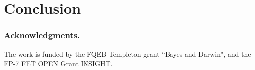 \documentclass[runningheads,a4paper]{llncs}
\begin{document}
\section{Conclusion}

\subsubsection*{Acknowledgments.} The work is funded by the FQEB Templeton grant ``Bayes and Darwin", and the FP-7 FET OPEN Grant INSIGHT.



\end{document}
